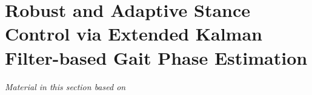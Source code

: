 \chapter{Robust and Adaptive Stance Control via Extended Kalman Filter-based
Gait Phase Estimation}\label{sec:phase_estimation}
\graphicspath{{chapters/phase_estimation/figures/}}

\emph{Material in this section based on}
\citet{thatte2019robust}\cite{thatte2019robust} 
\linebreak






